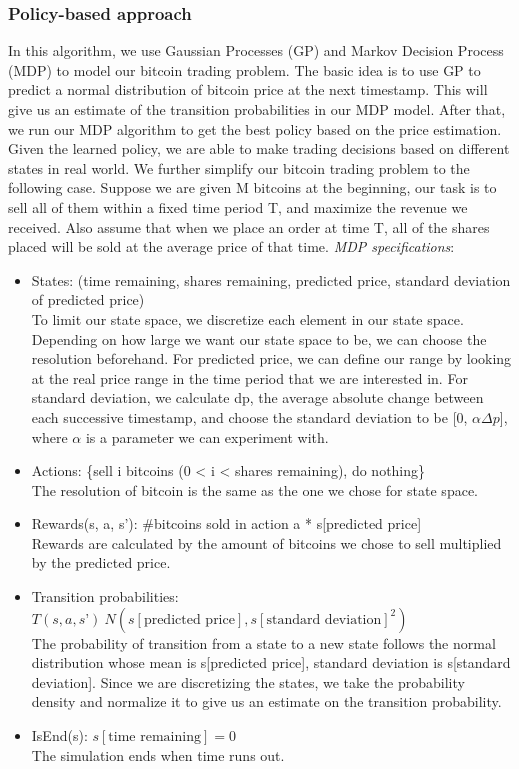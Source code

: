 \documentclass[10pt]{article}
\begin{document}
\subsubsection*{Policy-based approach}										
 In this algorithm, we use Gaussian Processes (GP) and Markov Decision Process (MDP) to model our bitcoin trading problem. The basic idea is to use GP to predict a normal distribution of bitcoin price at the next timestamp. This will give us an estimate of the transition probabilities in our MDP model. After that, we run our MDP algorithm to get the best policy based on the price estimation. Given the learned policy, we are able to make trading decisions based on different states in real world. We further simplify our bitcoin trading problem to the following case. Suppose we are given M bitcoins at the beginning, our task is to sell all of them within a fixed time period T, and maximize the revenue we received. Also assume that when we place an order at time T, all of the shares placed will be sold at the average price of that time.
\emph{ MDP specifications}:
\begin{itemize}
\item States: (time remaining, shares remaining, predicted price, standard deviation of predicted price)\\
 To limit our state space, we discretize each element in our state space. Depending on how large we want our state space to be, we can choose the resolution beforehand. For predicted price, we can define our range by looking at the real price range in the time period that we are interested in. For standard deviation, we calculate dp, the average absolute change between each successive timestamp, and choose the standard deviation to be [0, $\alpha \Delta p$], where $\alpha$ is a parameter we can experiment with.
 \item Actions: \{sell i bitcoins (0 < i < shares remaining), do nothing\}\\
 The resolution of bitcoin is the same as the one we chose for state space.
 \item Rewards(s, a, s’): \#bitcoins sold in action a * s[predicted price]\\
 Rewards are calculated by the amount of bitcoins we chose to sell multiplied by the predicted price.
 \item Transition probabilities: $T(s, a, s’) ~ N(s[\text{predicted price}], s[\text{standard deviation}]^2)$\\
 The probability of transition from a state to a new state follows the normal distribution whose mean is s[predicted price], standard deviation is s[standard deviation]. Since we are discretizing the states, we take the probability density and normalize it to give us an estimate on the transition probability.
 \item IsEnd(s): $s[\text{time remaining}] = 0$\\
 The simulation ends when time runs out.
 \end{itemize}
\end{document}
